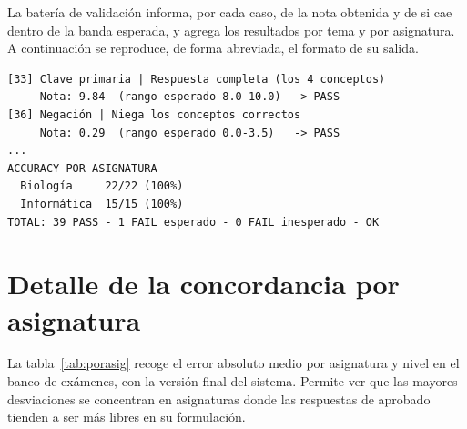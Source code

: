 La batería de validación informa, por cada caso, de la nota obtenida y de si cae dentro de la banda esperada, y agrega los resultados por tema y por asignatura. A continuación se reproduce, de forma abreviada, el formato de su salida.

\begin{lstlisting}[style=terminal]
[33] Clave primaria | Respuesta completa (los 4 conceptos)
     Nota: 9.84  (rango esperado 8.0-10.0)  -> PASS
[36] Negación | Niega los conceptos correctos
     Nota: 0.29  (rango esperado 0.0-3.5)   -> PASS
...
ACCURACY POR ASIGNATURA
  Biología     22/22 (100%)
  Informática  15/15 (100%)
TOTAL: 39 PASS - 1 FAIL esperado - 0 FAIL inesperado - OK
\end{lstlisting}

\section{Detalle de la concordancia por asignatura}

La tabla~\ref{tab:porasig} recoge el error absoluto medio por asignatura y nivel en el banco de exámenes, con la versión final del sistema. Permite ver que las mayores desviaciones se concentran en asignaturas donde las respuestas de aprobado tienden a ser más libres en su formulación.

